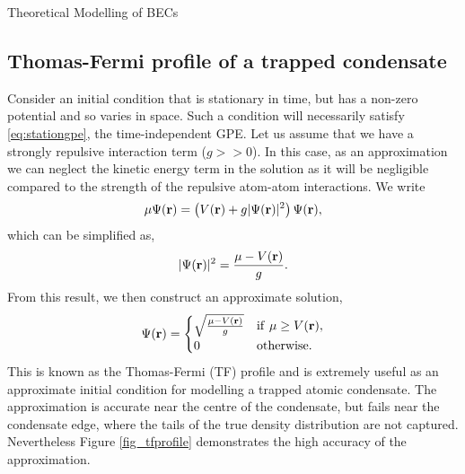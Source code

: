 \begin{chapter}{\label{cha:theoretical_model}Theoretical Modelling of BECs}
	\subsection{\label{section:tftrap} Thomas-Fermi profile of a trapped condensate}
	Consider an initial condition that is stationary in time, but has a non-zero potential and so varies in space. Such a condition will necessarily satisfy \ref{eq:stationgpe}, the time-independent GPE. Let us assume that we have a strongly repulsive interaction term ($g>>0$). In this case, as an approximation we can neglect the kinetic energy term in the solution as it will be negligible compared to the strength of the repulsive atom-atom interactions. We write
	\begin{equation}
		\mu\Psi({\bf r}) = \left(V({\bf r}) + g|\Psi({\bf r})|^2  \right) \Psi({\bf r}),
	\end{equation}
	which can be simplified as,
	\begin{equation}
	 |\Psi({\bf r})|^2=\frac{\mu - V({\bf r})}{g}.
	\end{equation}
	From this result, we then construct an approximate solution,
	\begin{equation}
	\Psi({\bf r}) =
	\begin{cases} 
    \sqrt{\frac{\mu - V({\bf r})}{g}} & \mathrm{if}~\mu\geq V({\bf r}), \\
    0 & \mathrm{otherwise}.
  \end{cases}
  \end{equation}
	This is known as the Thomas-Fermi (TF) profile and is extremely useful as an approximate initial condition for modelling a trapped atomic condensate. The approximation is accurate near the centre of the condensate, but fails near the condensate edge, where the tails of the true density distribution are not captured. Nevertheless Figure \ref{fig_tfprofile} demonstrates the high accuracy of the approximation.
	\begin{figure}
	\centering
\end{figure}
\end{chapter}
